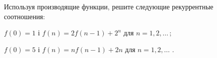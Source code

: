 \begin{problemList}
\problemItemWithCommonPart
{}
{Используя производящие функции, решите следующие рекуррентные соотношения:}
{\begin{belarusianEnumerate}
  \item $f(0) = 1$ і $f(n) = 2f(n - 1) + 2^n$ для $n = 1, 2, \ldots\, $;
  \item $f(0) = 5$ і $f(n) = nf(n - 1) + 2n$ для $n = 1, 2, \ldots\,\, $.
\end{belarusianEnumerate}}

\end{problemList}


